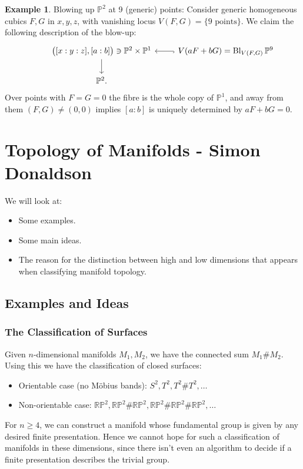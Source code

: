 \documentclass{article}
\theoremstyle{definition}
\newtheorem*{example}{Example}
\DeclareMathOperator{\Bl}{Bl}
\newcommand{\RP}{\mathbb{RP}}
\renewcommand{\P}{\mathbb{P}}
\begin{document}
\begin{example}
    Blowing up $\P^2$ at 9 (generic) points: Consider generic homogeneous cubics
    $F,G$ in $x,y,z$, with vanishing locus $V(F,G)=\{\text{9 points}\}$. We
    claim the following description of the blow-up:
    \begin{equation*}
        \begin{tikzcd}
            &\bigl([x:y:z],[a:b]\bigr)\ni\P^2\times\P^1 \ar[d]
            &V(aF+bG)=\Bl_{V(F,G)}\P^9 \ar[l,hook] \\
            &\P^2.
        \end{tikzcd}
    \end{equation*}
    Over points with $F=G=0$ the fibre is the whole copy of $\P^1$, and away
    from them $(F,G)\ne(0,0)$ implies $[a:b]$ is uniquely determined by
    $aF+bG=0$.
\end{example}

\newpage

\section{Topology of Manifolds - Simon Donaldson}

We will look at:
\begin{itemize}
    \item Some examples.
    \item Some main ideas.
    \item The reason for the distinction between high and low dimensions that
        appears when classifying manifold topology.
\end{itemize}

\subsection{Examples and Ideas}

\subsubsection*{The Classification of Surfaces}

Given $n$-dimensional manifolds $M_1,M_2$, we have the connected sum $M_1\#M_2$.
Using this we have the classification of closed surfaces:
\begin{itemize}
    \item Orientable case (no M\"obius bands): $S^2,T^2,T^2\#T^2,\ldots$
    \item Non-orientable case: $\RP^2,\RP^2\#\RP^2,\RP^2\#\RP^2\#\RP^2,\ldots$
\end{itemize}
For $n\ge4$, we can construct a manifold whose fundamental group is given by any
desired finite presentation. Hence we cannot hope for such a classification of
manifolds in these dimensions, since there isn't even an algorithm to decide if
a finite presentation describes the trivial group.
\end{document}
